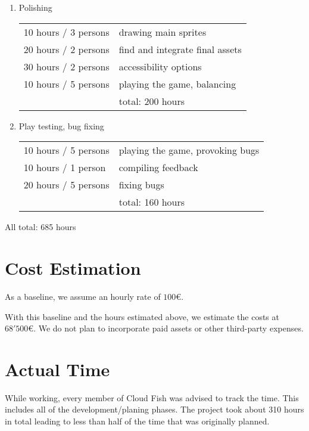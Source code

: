 \documentclass[a4paper]{scrreprt}
\begin{document}
\begin{enumerate}
    \item Polishing \\
    \begin{tabularx}{\linewidth}{lX}
        10 hours / 3 persons & drawing main sprites \\
        20 hours / 2 persons & find and integrate final assets \\
        30 hours / 2 persons & accessibility options \\
        10 hours / 5 persons & playing the game, balancing \\
        \cline{2-2} & total: 200 hours \\
    \end{tabularx}
    \item Play testing, bug fixing \\
    \begin{tabularx}{\linewidth}{lX}
        10 hours / 5 persons & playing the game, provoking bugs \\
        10 hours / 1 person & compiling feedback \\
        20 hours / 5 persons & fixing bugs \\
        \cline{2-2} & total: 160 hours \\
    \end{tabularx}
\end{enumerate}

All total: 685 hours

\section{Cost Estimation}

As a baseline, we assume an hourly rate of $100$\euro.

With this baseline and the hours estimated above, we estimate the costs at $68'500$\euro. We do not plan to incorporate paid assets or other third-party expenses.

\section{Actual Time}

While working, every member of Cloud Fish was advised to track the time. This includes all of the development/planing phases. The project took about 310 hours in total leading to less than half of the time that was originally planned.

\end{document}
